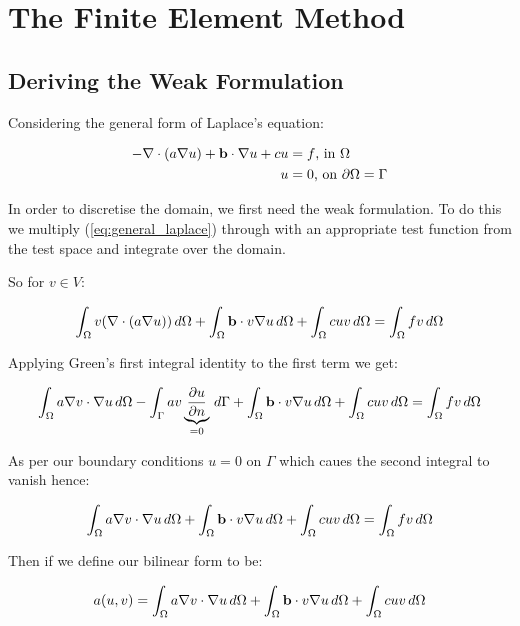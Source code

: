 \chapter{The Finite Element Method}


\section{Deriving the Weak Formulation}


Considering the general form of Laplace's equation:

\begin{align}\label{eq:general_laplace}
    -\nabla\cdot(a\nabla{u}) + \mathbf{b}\cdot\nabla{u} + cu &= f \text{, in } \Omega \\
    u &= 0 \text{, on } \partial\Omega = \Gamma
\end{align}

In order to discretise the domain, we first need the weak formulation. To do
this we multiply (\ref{eq:general_laplace}) through with an appropriate test
function from the test space and integrate over the domain.

So for $v \in V$:

\[
    \int_{\Omega}{v(\nabla\cdot(a\nabla{u}))}\,d\Omega +
    \int_{\Omega}\mathbf{b}\cdot v\nabla{u}\,d\Omega +
    \int_{\Omega}cuv\,d\Omega = \int_{\Omega}fv\,d\Omega
\]

Applying Green's first integral identity to the first term we get:

\[
    \int_{\Omega}a\nabla{v}\cdot\nabla{u}\,d\Omega -
    \int_{\Gamma}av
      \underbrace{\frac{\partial{u}}{\partial{n}}}_{=0}
      \,d\Gamma +
    \int_{\Omega}\mathbf{b}\cdot v\nabla{u}\,d\Omega + \int_{\Omega}cuv\,d\Omega =
    \int_{\Omega}fv\,d\Omega
\]

As per our boundary conditions $u=0$ on $\Gamma$ which caues the second
integral to vanish hence:

\[
    \int_{\Omega}a\nabla{v}\cdot\nabla{u}\,d\Omega +
    \int_{\Omega}\mathbf{b}\cdot v\nabla{u}\,d\Omega + \int_{\Omega}cuv\,d\Omega =
    \int_{\Omega}fv\,d\Omega
\]

Then if we define our bilinear form to be:

\[
    a(u,v) =
    \int_{\Omega}a\nabla{v}\cdot\nabla{u}\,d\Omega +
    \int_{\Omega}\mathbf{b}\cdot v\nabla{u}\,d\Omega + \int_{\Omega}cuv\,d\Omega
\]

